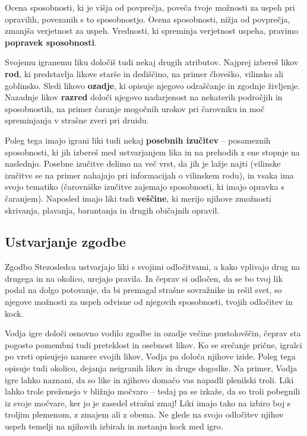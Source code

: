 Ocena sposobnosti, ki je višja od povprečja, poveča tvoje možnosti za uspeh pri opravilih, povezanih s to sposobnostjo. Ocena sposobnosti, nižja od povprečja, zmanjša verjetnost za uspeh. Vrednosti, ki spreminja verjetnost uspeha, pravimo \textbf{popravek sposobnosti}.

Svojemu igranemu liku določiš tudi nekaj drugih atributov. Najprej izbereš likov \textbf{rod}, ki predstavlja likove starše in dediščino, na primer človeško, vilinsko ali goblinsko. Sledi likovo \textbf{ozadje}, ki opisuje njegovo odraščanje in zgodnje življenje. Nazadnje likov \textbf{razred} določi njegovo nadarjenost na nekaterih področjih in sposobnostih, na primer čaranje mogočnih urokov pri čarovniku in moč spreminjanja v strašne zveri pri druidu.

Poleg tega imajo igrani liki tudi nekaj \textbf{posebnih izučitev} -- posameznih sposobnosti, ki jih izbereš med ustvarjanjem lika in na prehodih z ene stopnje na naslednjo. Posebne izučitve delimo na več vrst, da jih je lažje najti (vilinske izučitve se na primer nahajajo pri informacijah o vilinskem rodu), in vsaka ima svojo tematiko (čarovniške izučitve zajemajo sposobnosti, ki imajo opravka s čaranjem). Naposled imajo liki tudi \textbf{veščine}, ki merijo njihove zmožnosti skrivanja, plavanja, barantanja in drugih običajnih opravil.

\subsection{Ustvarjanje zgodbe}

Zgodbo Stezosledca ustvarjajo liki s svojimi odločitvami, a kako vplivajo drug na drugega in na okolico, urejajo pravila. In čeprav si odločen, da se bo tvoj lik podal na dolgo potovanje, da bi premagal strašne sovražnike in rešil svet, so njegove možnosti za uspeh odvisne od njegovih sposobnosti, tvojih odločitev in kock.

Vodja igre določi osnovno vodilo zgodbe in ozadje večine pustolovščin, čeprav sta pogosto pomembni tudi preteklost in osebnost likov. Ko se srečanje prične, igralci po vrsti opisujejo namere svojih likov, Vodja pa določa njihove izide. Poleg tega opisuje tudi okolico, dejanja neigranih likov in druge dogodke. Na primer, Vodja igre lahko naznani, da so like in njihovo domačo vas napadli plenilski troli. Liki lahko trole preženejo v bližnjo močvaro -- tedaj pa se izkaže, da so troli pobegnili iz svoje močvare, ker jo je zasedel strašni zmaj! Liki imajo tako na izbiro boj s troljim plemenom, z zmajem ali z obema. Ne glede na svojo odločitev njihov uspeh temelji na njihovih izbirah in metanju kock med igro.


